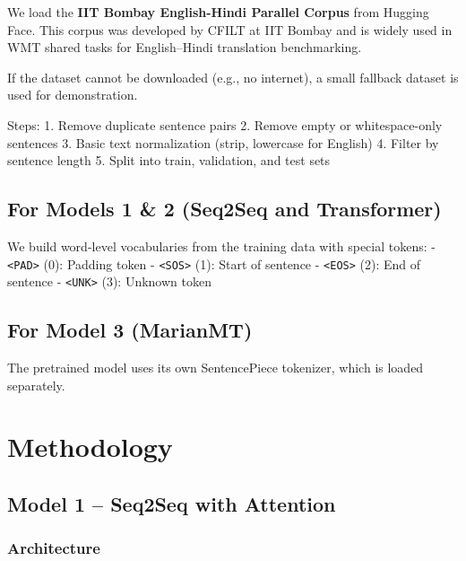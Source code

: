 \documentclass[12pt,a4paper,oneside]{report}
\begin{document}
We load the \textbf{IIT Bombay English-Hindi Parallel Corpus} from Hugging Face. This corpus was developed by CFILT at IIT Bombay and is widely used in WMT shared tasks for English--Hindi translation benchmarking.

If the dataset cannot be downloaded (e.g., no internet), a small fallback dataset is used for demonstration.

Steps:
1. Remove duplicate sentence pairs
2. Remove empty or whitespace-only sentences
3. Basic text normalization (strip, lowercase for English)
4. Filter by sentence length
5. Split into train, validation, and test sets

\hypertarget{for-models-1-2-seq2seq-and-transformer}{%
\subsection{For Models 1 \& 2 (Seq2Seq and Transformer)}\label{for-models-1-2-seq2seq-and-transformer}}

We build word-level vocabularies from the training data with special tokens:
- \texttt{\textless{}PAD\textgreater{}} (0): Padding token
- \texttt{\textless{}SOS\textgreater{}} (1): Start of sentence
- \texttt{\textless{}EOS\textgreater{}} (2): End of sentence
- \texttt{\textless{}UNK\textgreater{}} (3): Unknown token

\hypertarget{for-model-3-marianmt}{%
\subsection{For Model 3 (MarianMT)}\label{for-model-3-marianmt}}

The pretrained model uses its own SentencePiece tokenizer, which is loaded separately.

\section{Methodology}
\hypertarget{model-1-seq2seq-with-attention}{%
\subsection{Model 1 -- Seq2Seq with Attention}\label{model-1-seq2seq-with-attention}}

\hypertarget{architecture}{%
\subsubsection{Architecture}\label{architecture}}
\end{document}
